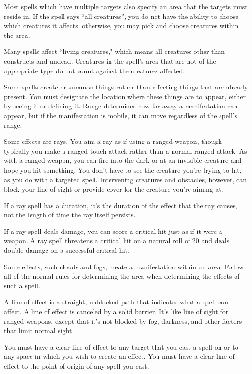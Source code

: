 Most spells which have multiple targets also specify an area that the targets must reside in. If the spell says ``all creatures'', you do not have the ability to choose which creatures it affects; otherwise, you may pick and choose creatures within the area.

Many spells affect ``living creatures," which means all creatures other than constructs and undead. Creatures in the spell's area that are not of the appropriate type do not count against the creatures affected.

 Some spells create or summon things rather than affecting things that are already present. You must designate the location where these things are to appear, either by seeing it or defining it. Range determines how far away a manifestation can appear, but if the manifestation is mobile, it can move regardless of the spell's range.

 Some effects are rays. You aim a ray as if using a ranged weapon, though typically you make a ranged touch attack rather than a normal ranged attack. As with a ranged weapon, you can fire into the dark or at an invisible creature and hope you hit something. You don't have to see the creature you're trying to hit, as you do with a targeted spell. Intervening creatures and obstacles, however, can block your line of sight or provide cover for the creature you're aiming at.

If a ray spell has a duration, it's the duration of the effect that the ray causes, not the length of time the ray itself persists.

If a ray spell deals damage, you can score a critical hit just as if it were a weapon. A ray spell threatens a critical hit on a natural roll of 20 and deals double damage on a successful critical hit.

 Some effects, such clouds and fogs, create a manifestation within an area. Follow all of the normal rules for determining the area when determining the effects of such a spell.

 A line of effect is a straight, unblocked path that indicates what a spell can affect. A line of effect is canceled by a solid barrier. It's like line of sight for ranged weapons, except that it's not blocked by fog, darkness, and other factors that limit normal sight.

You must have a clear line of effect to any target that you cast a spell on or to any space in which you wish to create an effect. You must have a clear line of effect to the point of origin of any spell you cast.

